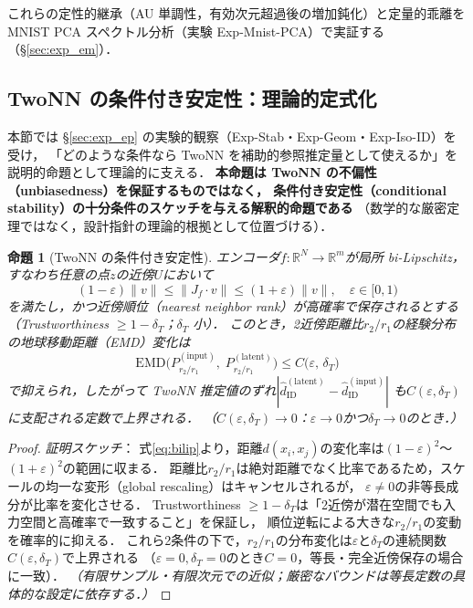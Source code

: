 \documentclass[11pt,a4paper]{jsarticle}
\newtheorem{proposition}{命題}
\newcommand{\R}{\mathbb{R}}
\begin{document}
これらの定性的継承（AU 単調性，有効次元超過後の増加鈍化）と定量的乖離を
MNIST PCA スペクトル分析（実験 Exp-Mnist-PCA）で実証する（§\ref{sec:exp_em}）．

\subsection{TwoNN の条件付き安定性：理論的定式化}\label{sec:theory_stability}

本節では §\ref{sec:exp_ep} の実験的観察（Exp-Stab・Exp-Geom・Exp-Iso-ID）を受け，
「どのような条件なら TwoNN を補助的参照推定量として使えるか」を
説明的命題として理論的に支える．
\textbf{本命題は TwoNN の不偏性（unbiasedness）を保証するものではなく，
条件付き安定性（conditional stability）の十分条件のスケッチを与える解釈的命題である}
（数学的な厳密定理ではなく，設計指針の理論的根拠として位置づける）．

\begin{proposition}[TwoNN の条件付き安定性]\label{thm:twonn_stability}
エンコーダ$f: \R^N \to \R^m$が局所 bi-Lipschitz，
すなわち任意の点$z$の近傍$U$において
\begin{equation}
  (1-\varepsilon)\|v\| \leq \|J_f \cdot v\| \leq (1+\varepsilon)\|v\|,
  \quad \varepsilon \in [0,1)
  \label{eq:bilip}
\end{equation}
を満たし，かつ近傍順位（nearest neighbor rank）が高確率で保存されるとする
（Trustworthiness $\geq 1 - \delta_T$；$\delta_T$ 小）．
このとき，2近傍距離比$r_2/r_1$の経験分布の地球移動距離（EMD）変化は
\begin{equation}
  \mathrm{EMD}\bigl(P_{r_2/r_1}^{(\mathrm{input})},\; P_{r_2/r_1}^{(\mathrm{latent})}\bigr)
  \leq C\bigl(\varepsilon,\, \delta_T\bigr)
  \label{eq:twonn_stab}
\end{equation}
で抑えられ，したがって TwoNN 推定値のずれ$|\hat{d}_\mathrm{ID}^{(\mathrm{latent})} - \hat{d}_\mathrm{ID}^{(\mathrm{input})}|$
も$C(\varepsilon,\delta_T)$に支配される定数で上界される．
（$C(\varepsilon, \delta_T) \to 0$：$\varepsilon \to 0$かつ$\delta_T \to 0$のとき．）
\end{proposition}

\begin{proof}
\textit{証明スケッチ}：
式\eqref{eq:bilip}より，距離$d(x_i, x_j)$の変化率は$(1-\varepsilon)^2$〜$(1+\varepsilon)^2$の範囲に収まる．
距離比$r_2/r_1$は絶対距離でなく比率であるため，スケールの均一な変形（global rescaling）はキャンセルされるが，
$\varepsilon \neq 0$の非等長成分が比率を変化させる．
Trustworthiness $\geq 1-\delta_T$は「2近傍が潜在空間でも入力空間と高確率で一致すること」を保証し，
順位逆転による大きな$r_2/r_1$の変動を確率的に抑える．
これら2条件の下で，$r_2/r_1$の分布変化は$\varepsilon$と$\delta_T$の連続関数$C(\varepsilon,\delta_T)$で上界される
（$\varepsilon=0, \delta_T=0$のとき$C=0$，等長・完全近傍保存の場合に一致）．
\textit{（有限サンプル・有限次元での近似；厳密なバウンドは等長定数の具体的な設定に依存する．）}
\end{proof}
\end{document}
